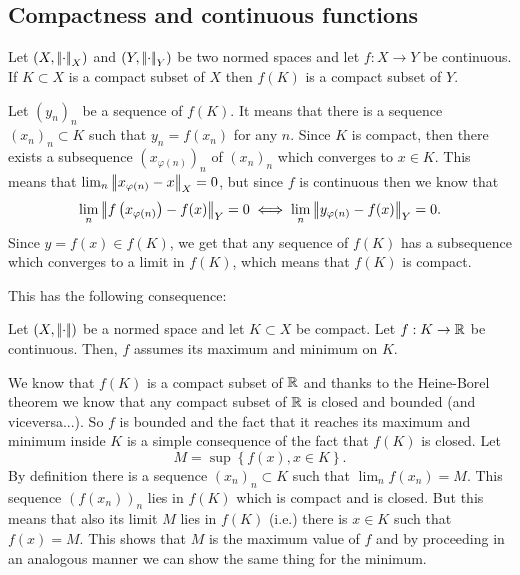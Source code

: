 \documentclass{article}
\begin{document}
\subsection{Compactness and continuous functions}
\begin{proposition}
	Let $(X,\left|\negthinspace\left|\cdot\right|\negthinspace\right|_X)$ and $(Y,\left|\negthinspace\left|\cdot\right|\negthinspace\right|_Y)$ be two normed spaces and let $f:X\to Y$ be continuous. If $K\subset X$ is a compact subset of $X$ then $f(K)$ is a compact subset of $Y$.
\end{proposition}
\begin{fancyproof}
	Let ${(y_{n})}_{n}$ be a sequence of $f(K)$. It means that there is a sequence ${(x_{n})}_{n}\subset K$ such that $y_{n}=f(x_n)$ for any $n$. Since $K$ is compact, then there exists a subsequence ${\left(x_{\varphi(n)}\right)}_{n}$ of ${(x_{n})}_{n}$ which converges to $x\in K$. This means that $\lim_n\left|\negthinspace\left|x_{\varphi(n)}-x\right|\negthinspace\right|_{X}=0$, but since $f$ is continuous then we know that 
	\begin{equation*}
		\lim_n\left|\negthinspace\left|f\left(x_{\varphi(n)}\right)-f(x)\right|\negthinspace\right|_{Y}=0\iff	\lim_n\left|\negthinspace\left|y_{\varphi(n)}-f(x)\right|\negthinspace\right|_{Y}=0.
	\end{equation*}
	Since $y=f(x)\in f(K)$, we get that any sequence of $f(K)$ has a subsequence which converges to a limit in $f(K)$, which means that $f(K)$ is compact.
\end{fancyproof}
This has the following consequence:
\begin{theorem}
	Let $\left(X,\left|\negthinspace\left|\cdot\right|\negthinspace\right|\right)$ be a normed space and let $K\subset X$ be compact. Let $f:K\to\mathbb{R}$ be continuous. Then, $f$ assumes its maximum and minimum on $K$.
\end{theorem}
\begin{fancyproof}
	We know that $f(K)$ is a compact subset of $\mathbb{R}$ and thanks to the Heine-Borel theorem we know that any compact subset of $\mathbb{R}$ is closed and bounded (and viceversa...). So $f$ is bounded and the fact that it reaches its maximum and minimum inside $K$ is a simple consequence of the fact that $f(K)$ is closed. Let
	\begin{equation*}
		M=\sup\left\{f(x),x\in K\right\}.
	\end{equation*}
	By definition there is a sequence ${(x_{n})}_{n}\subset K$ such that $\lim_{n}f(x_{n})=M$. This sequence ${(f(x_{n}))}_{n}$ lies in $f(K)$ which is compact and is closed. But this means that also its limit $M$ lies in $f(K)$ (i.e.) there is $x\in K$ such that $f(x)=M$. This shows that $M$ is the maximum value of $f$ and by proceeding in an analogous manner we can show the same thing for the minimum.
\end{fancyproof}
\end{document}
